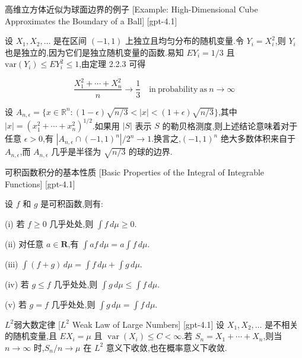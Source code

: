 \documentclass[UTF8]{ctexart}
\begin{document}
    
    
    \begin{xmp}
        {高维立方体近似为球面边界的例子}
        [Example: High-Dimensional Cube Approximates the Boundary of a Ball]
        [gpt-4.1]
        
设 $X_1, X_2, \dots$ 是在区间 $(-1, 1)$ 上独立且均匀分布的随机变量.令 $Y_i = X_i^2$,则 $Y_i$ 也是独立的,因为它们是独立随机变量的函数.易知 $E Y_i = 1/3$ 且 $\mathrm{var}(Y_i) \leq E Y_i^2 \leq 1$,由定理 2.2.3 可得

\[
\frac{X_1^2 + \cdots + X_n^2}{n} \to \frac{1}{3} \quad \mathrm{in~probability~as~} n \to \infty
\]

设 $A_{n, \epsilon} = \{x \in \mathbb{R}^n : (1-\epsilon)\sqrt{n/3} < |x| < (1+\epsilon)\sqrt{n/3}\}$,其中 $|x| = (x_1^2 + \cdots + x_n^2)^{1/2}$.如果用 $|S|$ 表示 $S$ 的勒贝格测度,则上述结论意味着对于任意 $\epsilon > 0$,有 $|A_{n, \epsilon} \cap (-1, 1)^n|/2^n \to 1$.换言之,$(-1, 1)^n$ 绝大多数体积来自于 $A_{n, \epsilon}$,而 $A_{n, \epsilon}$ 几乎是半径为 $\sqrt{n/3}$ 的球的边界.

    \end{xmp}
    
    
    
    \begin{thm}
        {可积函数积分的基本性质}
        [Basic Properties of the Integral of Integrable Functions]
        [gpt-4.1]
        
设 $f$ 和 $g$ 是可积函数,则有:

(i) 若 $f \geq 0$ 几乎处处,则 $\int f \, d\mu \geq 0$.

(ii) 对任意 $a \in \mathbf{R}$,有 $\int a f \, d\mu = a \int f \, d\mu$.

(iii) $\int (f + g) \, d\mu = \int f \, d\mu + \int g \, d\mu$.

(iv) 若 $g \le f$ 几乎处处,则 $\int g \, d\mu \leq \int f \, d\mu$.

(v) 若 $g = f$ 几乎处处,则 $\int g \, d\mu = \int f \, d\mu$.

    \end{thm}
    
    
    
    \begin{thm}
        {$L^2$弱大数定律}
        [$L^2$ Weak Law of Large Numbers]
        [gpt-4.1]
        设 $X_1, X_2, \dots$ 是不相关的随机变量,且 $E X_i = \mu$ 且 $\operatorname{var}(X_i) \leq C < \infty$.若 $S_n = X_1 + \cdots + X_n$,则当 $n \to \infty$ 时,$S_n / n \to \mu$ 在 $L^2$ 意义下收敛,也在概率意义下收敛.
    \end{thm}
    
\end{document}
